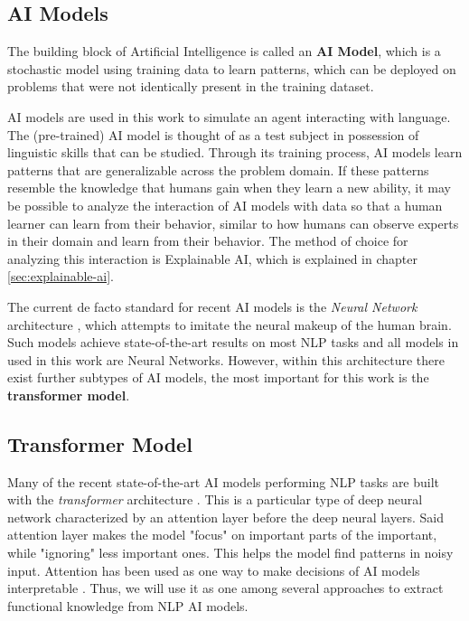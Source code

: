 \subsection{AI Models}
The building block of Artificial Intelligence is called an \textbf{AI Model}, which is a stochastic model using training data to learn patterns, which can be deployed on problems that were not identically present in the training dataset.

AI models are used in this work to simulate an agent interacting with language.
The (pre-trained) AI model is thought of as a test subject in possession of linguistic skills that can be studied.
Through its training process, AI models learn patterns that are generalizable across the problem domain.
If these patterns resemble the knowledge that humans gain when they learn a new ability, it may be possible to analyze the interaction of AI models with data so that a human learner can learn from their behavior, similar to how humans can observe experts in their domain and learn from their behavior.
The method of choice for analyzing this interaction is Explainable AI, which is explained in chapter \ref{sec:explainable-ai}.

The current de facto standard for recent AI models is the \textit{Neural Network} architecture , which attempts to imitate the neural makeup of the human brain.
Such models achieve state-of-the-art results on most NLP tasks  and all models in used in this work are Neural Networks.
However, within this architecture there exist further subtypes of AI models, the most important for this work is the \textbf{transformer model}.



\subsection{Transformer Model} \label{sec:transformer}
Many of the recent state-of-the-art AI models performing NLP tasks are built with the \textit{transformer} architecture .
This is a particular type of deep neural network characterized by an attention layer before the deep neural layers.
Said attention layer makes the model "focus" on important parts of the important, while "ignoring" less important ones.
This helps the model find patterns in noisy input.
Attention has been used as one way to make decisions of AI models interpretable  .
Thus, we will use it as one among several approaches to extract functional knowledge from NLP AI models.

